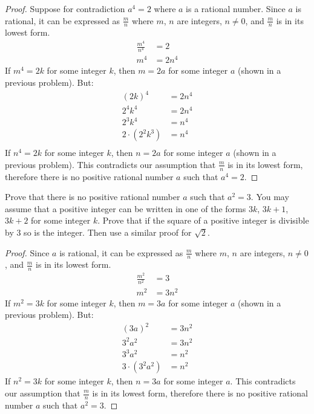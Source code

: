 \begin{proof} Suppose for contradiction $a^4 = 2$ where $a$ is a rational number.
Since $a$ is rational, it can be expressed as $\frac{m}{n}$ where $m$, $n$ are integers, 
$n \not = 0$, and $\frac{m}{n}$
is in its lowest form.
\begin{align*}
\frac{m^4}{n^4} &= 2 \\
m^4 &= 2n^4
\end{align*}
If $m^4 = 2k$ for some integer $k$, then $m = 2a$ for some integer $a$ (shown in a previous problem). 
But:
\begin{align*}
{(2k)}^4 &= 2n^4 \\
2^4k^4 &= 2n^4 \\
2^3k^4 &= n^4 \\
2 \cdot (2^2k^3) &= n^4 \\
\end{align*}
If $n^4 = 2k$ for some integer $k$, then $n = 2a$ for some integer $a$ (shown in a previous problem). 
This contradicts our assumption that $\frac{m}{n}$ is in its lowest form, therefore
there is no positive rational number $a$ such that $a^4 = 2$.
\end{proof}


\begin{tcolorbox}[title=Problem 10, breakable]
Prove that there is no positive rational number $a$ such that $a^2 = 3$. You 
may assume that a positive integer can be written in one of the forms
$3k$, $3k + 1$, $3k + 2$ for some integer $k$. Prove that if the square of a
positive integer is divisible by $3$ so is the integer. Then use a similar proof
for $\sqrt{2}$.
\end{tcolorbox}

\begin{proof}
Since $a$ is rational, it can be expressed as $\frac{m}{n}$ where $m$, $n$ are integers, 
$n \not = 0$, and $\frac{m}{n}$
is in its lowest form.
\begin{align*}
\frac{m^2}{n^2} &= 3 \\
m^2 &= 3n^2
\end{align*}
If $m^2 = 3k$ for some integer $k$, then $m = 3a$ for some integer $a$ (shown in a previous problem). 
But:
\begin{align*}
{(3a)}^2 &= 3n^2 \\
3^2a^2 &= 3n^2 \\
3^3a^2 &= n^2 \\
3 \cdot (3^2a^2) &= n^2
\end{align*}
If $n^2 = 3k$ for some integer $k$, then $n = 3a$ for some integer $a$. 
This contradicts our assumption that $\frac{m}{n}$ is in its lowest form, therefore
there is no positive rational number $a$ such that $a^2 = 3$.
\end{proof}


